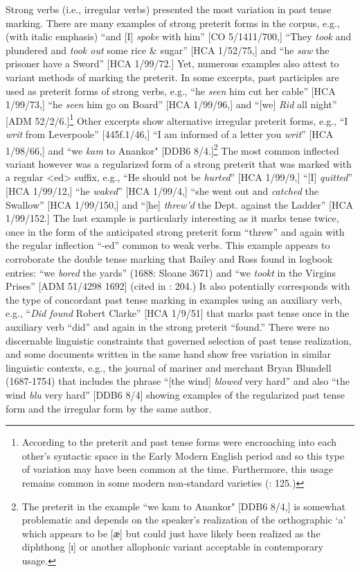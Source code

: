 Strong verbs (i.e., irregular verbs) presented the most variation in past tense marking. There are many examples of strong preterit forms in the corpus, e.g., (with italic emphasis) “and [I] \textit{spoke} with him” [CO 5/1411/700,] “They \textit{took} and plundered and \textit{took out} some rice \& sugar” [HCA 1/52/75,] and “he \textit{saw} the prisoner have a Sword” [HCA 1/99/72.] Yet, numerous examples also attest to variant methods of marking the preterit. In some excerpts, past participles are used as preterit forms of strong verbs, e.g., “he \textit{seen} him cut her cable” [HCA 1/99/73,] “he \textit{seen} him go on Board” [HCA 1/99/96,] and “[we] \textit{Rid} all night” [ADM 52/2/6.]\footnote{According to \citet[95]{Blake2002} the preterit and past tense forms were encroaching into each other’s syntactic space in the Early Modern English period and so this type of variation may have been common at the time. Furthermore, this usage remains common in some modern non-standard varieties (\citealt{Cheshire1994}: 125.)} Other excerpts show alternative irregular preterit forms, e.g., “I \textit{writ} from Leverpoole” [445f.1/46,] “I am informed of a letter you \textit{writ}” [HCA 1/98/66,] and “we \textit{kam} to Anankor" [DDB6 8/4.]\footnote{The preterit in the example “we kam to Anankor" [DDB6 8/4,] is somewhat problematic and depends on the speaker’s realization of the orthographic ‘a’ which appears to be [{ӕ] but could just have likely been realized as the diphthong [{ɪ}] or another allophonic variant acceptable in contemporary usage.} } The most common inflected variant however was a regularized form of a strong preterit that was marked with a regular <ed> suffix, e.g., “He should not be \textit{hurted}” [HCA 1/99/9,] “[I] \textit{quitted}” [HCA 1/99/12,] “he \textit{waked}” [HCA 1/99/4,] “she went out and \textit{catched} the Swallow” [HCA 1/99/150,] and “[he] \textit{threw’d} the Dept. against the Ladder” [HCA 1/99/152.] The last example is particularly interesting as it marks tense twice, once in the form of the anticipated strong preterit form “threw” and again with the regular inflection “-ed” common to weak verbs. This example appears to corroborate the double tense marking that Bailey and Ross found in logbook entries: “we \textit{bored} the yards” (1688: Sloane 3671) and “we \textit{tookt} in the Virgins Prises” [ADM 51/4298 1692] (cited in \citealt{BaileyRoss1988}: 204.) It also potentially corresponds with the type of concordant past tense marking in examples using an auxiliary verb, e.g., “\textit{Did found} Robert Clarke” [HCA 1/9/51] that marks past tense once in the auxiliary verb “did” and again in the strong preterit “found.” There were no discernable linguistic constraints that governed selection of past tense realization, and some documents written in the same hand show free variation in similar linguistic contexts, e.g., the journal of mariner and merchant Bryan Blundell (1687-1754) that includes the phrase “[the wind] \textit{blowed} very hard” and also “the wind \textit{blu} very hard” [DDB6 8/4] showing examples of the regularized past tense form and the irregular form by the same author. 

